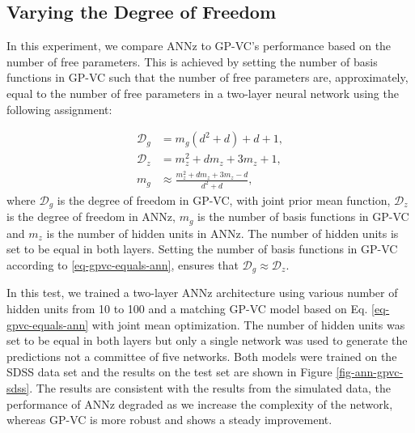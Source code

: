 \documentclass[useAMS,usenatbib,fleqn]{mn2e}
\begin{document}
\subsection{Varying the Degree of Freedom}

In this experiment, we compare {\sc ANNz} to GP-VC's performance based on the number of free parameters. This is achieved by setting the number of basis functions in GP-VC such that the number of free parameters are, approximately, equal to the number of free parameters in a two-layer neural network using the following assignment:

\begin{subequations}
\begin{align}
\label{eq-gpvc-degree}
\mathcal{D}_{g}		&=		m_{g}\left(d^{2}+d\right)+d+1,\\
\label{eq-ann-degree}
\mathcal{D}_{z}	&=		m_{z}^{2}+dm_{z}+3m_{z}+1,\\
\label{eq-gpvc-equals-ann}
m_{g}		&\approx 	\frac{m_{z}^{2}+dm_{z}+3m_{z}-d}{d^{2}+d},
\end{align}
\end{subequations}
where $\mathcal{D}_{g}$ is the degree of freedom in GP-VC, with joint prior mean function, $\mathcal{D}_{z}$ is the degree of freedom in {\sc ANNz}, $m_{g}$ is the number of basis functions in GP-VC and $m_{z}$ is the number of hidden units in {\sc ANNz}. The number of hidden units is set to be equal in both layers. Setting the number of basis functions in GP-VC according to \eqref{eq-gpvc-equals-ann}, ensures that $\mathcal{D}_{g} \approx \mathcal{D}_{z}$.

In this test, we trained a two-layer {\sc ANNz} architecture using various number of hidden units from 10 to 100 and a matching GP-VC model based on Eq. \eqref{eq-gpvc-equals-ann} with joint mean optimization. The number of hidden units was set to be equal in both layers but only a single network was used to generate the predictions not a committee of five networks. Both models were trained on the SDSS data set and the results on the test set are shown in Figure \ref{fig-ann-gpvc-sdss}. The results are consistent with the results from the simulated data, the performance of {\sc ANNz} degraded as we increase the complexity of the network, whereas GP-VC is more robust and shows a steady improvement.
\end{document}
